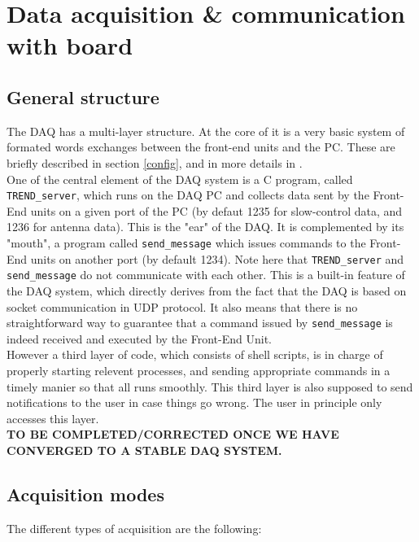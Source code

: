 \section{Data acquisition \& communication with board} 
\label{DAQ}

\subsection{General structure}
The DAQ has a multi-layer structure. At the core of it is a very basic system of formated words exchanges between the front-end units and the PC. These are briefly described in section \ref{config}, and in more details in \cite{GP35daq}. \\
%
One of the central element of the DAQ system is a C program, called \texttt{TREND\_server}, which  runs on the DAQ PC and collects data sent by the Front-End units on a given port of the PC (by defaut 1235 for slow-control data, and 1236 for antenna data). This is the "ear" of the DAQ. It is complemented by its "mouth", a program called \texttt{send\_message} which issues commands to the Front-End units on another port (by default 1234).  Note here that \texttt{TREND\_server} and \texttt{send\_message} do not communicate with each other. This is a built-in feature of the DAQ system, which directly derives from the fact that the DAQ is based on socket communication in UDP protocol. It also means that there is no straightforward way to guarantee that a command issued by \texttt{send\_message} is indeed received and executed by the Front-End Unit. \\
%
However a third layer of code, which consists of shell scripts, is in charge of properly starting relevent processes, and sending appropriate commands in a timely manier so that all runs smoothly. This third layer is also supposed to send notifications to the user in case things go wrong. The user in principle only accesses this layer.   \\

{\bf TO BE COMPLETED/CORRECTED ONCE WE HAVE CONVERGED TO A STABLE DAQ SYSTEM.}

\subsection{Acquisition modes}
The different types of acquisition are the following:

